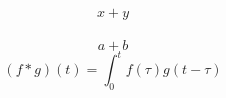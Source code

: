 \documentclass{article}
\begin{document}
\[   x + y      \] \\
\[     a + b    \]
\[ (f * g)(t) = \int_0^t f(\tau)g(t-\tau) \]



\end{document}

